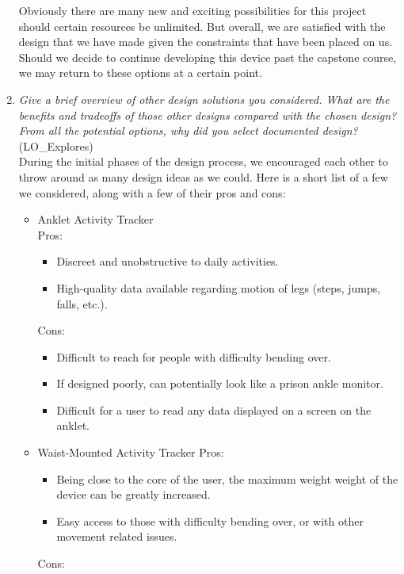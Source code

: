 \documentclass[12pt, titlepage]{article}
\begin{document}
\begin{enumerate}
Obviously there are many new and exciting possibilities for this project should certain resources be unlimited. But overall, we are satisfied with the design that we have made given the constraints that have been placed on us. Should we decide to continue developing this device past the capstone course, we may return to these options at a certain point.\\

  \item \textit{Give a brief overview of other design solutions you considered.  What
  are the benefits and tradeoffs of those other designs compared with the chosen
  design?  From all the potential options, why did you select documented design?}
  (LO\_Explores)\\

During the initial phases of the design process, we encouraged each other to throw around as many design ideas as we could. Here is a short list of a few we considered, along with a few of their pros and cons:\\
\begin{itemize}
\item Anklet Activity Tracker\\
	Pros:
	\begin{itemize}
		\item Discreet and unobstructive to daily activities.
		\item High-quality data available regarding motion of legs (steps, jumps, falls, etc.).
	\end{itemize}
	Cons:
	\begin{itemize}
		\item Difficult to reach for people with difficulty bending over.
		\item If designed poorly, can potentially look like a prison ankle monitor.
		\item Difficult for a user to read any data displayed on a screen on the anklet.
	\end{itemize}
\item Waist-Mounted Activity Tracker
	Pros:
	\begin{itemize}
		\item Being close to the core of the user, the maximum weight weight of the device can be greatly increased.
		\item Easy access to those with difficulty bending over, or with other movement related issues.
	\end{itemize}
	Cons:
	\begin{itemize}

\end{itemize}
\end{itemize}
\end{enumerate}
\end{document}
